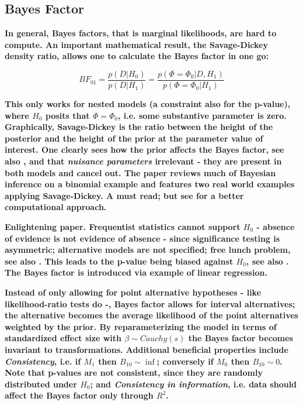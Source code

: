 \documentclass[12pt]{scrartcl}
\begin{document}
\subsection{Bayes Factor}
\begin{description}
  \item {}
  
  \item {}
  
  \item {}
  
  \textbf{In general, Bayes factors, that is marginal likelihoods, are hard to compute. An important mathematical result, the Savage-Dickey density ratio, allows one to calculate the Bayes factor in one go:}
  
  \begin{equation*}
    BF_{01} = \frac{p(D|H_0)}{p(D|H_1)} = \frac{p(\Phi = \Phi_0|D, H_1)}{p(\Phi = \Phi_0|H_1)}
  \end{equation*}
  
  \textbf{This only works for nested models (a constraint also for the p-value), where $H_0$ posits that $\Phi = \Phi_0$, i.e. some substantive parameter is zero. Graphically, Savage-Dickey is the ratio between the height of the posterior and the height of the prior at the parameter value of interest. One clearly sees how the prior affects the Bayes factor, see also \cite{liu2008bayes}, and that \emph{nuisance parameters} irrelevant - they are present in both models and cancel out. The paper reviews much of Bayesian inference on a binomial example and features two real world examples applying Savage-Dickey. A must read; but see \cite{morey2011using} for a better computational approach.}
  
  \item {}
  
  \textbf{Enlightening paper. Frequentist statistics cannot support $H_0$ - absence of evidence is not evidence of absence - since significance testing is asymmetric; alternative models are not specified; free lunch problem, see also \cite{rouder2015lunch}. This leads to the p-value being biased against $H_0$, see also \cite{wagenmakers2007practical, rouder2009bayesian}. The Bayes factor is introduced via example of linear regression.}
  
  \textbf{Instead of only allowing for point alternative hypotheses - like likelihood-ratio tests do -, Bayes factor allows for interval alternatives; the alternative becomes the average likelihood of the point alternatives weighted by the prior. By reparameterizing the model in terms of standardized effect size with $\beta \sim Cauchy(s)$ the Bayes factor becomes invariant to transformations. Additional beneficial properties include \emph{Consistency}, i.e. if $M_1$ then $B_{10} \sim \inf$; conversely if $M_0$ then $B_{10} \sim 0$. Note that p-values are not consistent, since they are randomly distributed under $H_0$; and \emph{Consistency in information}, i.e. data should affect the Bayes factor only through $R^2$.}
  

\end{description}
\end{document}

